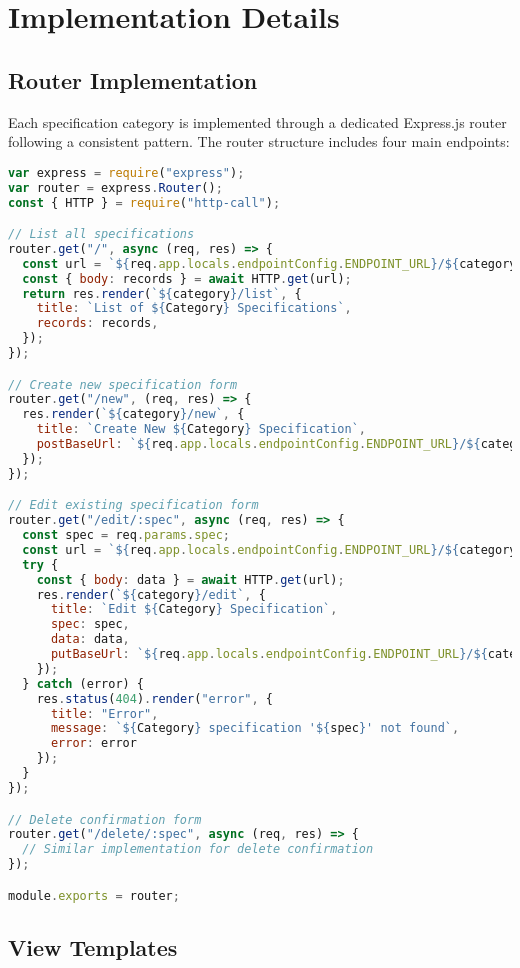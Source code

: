 \documentclass[11pt,a4paper]{article}
\begin{document}
\section{Implementation Details}

\subsection{Router Implementation}

Each specification category is implemented through a dedicated Express.js router following a consistent pattern. The router structure includes four main endpoints:

\begin{lstlisting}[language=JavaScript, caption=Generic Router Pattern]
var express = require("express");
var router = express.Router();
const { HTTP } = require("http-call");

// List all specifications
router.get("/", async (req, res) => {
  const url = `${req.app.locals.endpointConfig.ENDPOINT_URL}/${category}`;
  const { body: records } = await HTTP.get(url);
  return res.render(`${category}/list`, {
    title: `List of ${Category} Specifications`,
    records: records,
  });
});

// Create new specification form
router.get("/new", (req, res) => {
  res.render(`${category}/new`, {
    title: `Create New ${Category} Specification`,
    postBaseUrl: `${req.app.locals.endpointConfig.ENDPOINT_URL}/${category}`,
  });
});

// Edit existing specification form
router.get("/edit/:spec", async (req, res) => {
  const spec = req.params.spec;
  const url = `${req.app.locals.endpointConfig.ENDPOINT_URL}/${category}/${spec}`;
  try {
    const { body: data } = await HTTP.get(url);
    res.render(`${category}/edit`, {
      title: `Edit ${Category} Specification`,
      spec: spec,
      data: data,
      putBaseUrl: `${req.app.locals.endpointConfig.ENDPOINT_URL}/${category}`,
    });
  } catch (error) {
    res.status(404).render("error", {
      title: "Error",
      message: `${Category} specification '${spec}' not found`,
      error: error
    });
  }
});

// Delete confirmation form
router.get("/delete/:spec", async (req, res) => {
  // Similar implementation for delete confirmation
});

module.exports = router;
\end{lstlisting}

\subsection{View Templates}
\end{document}

